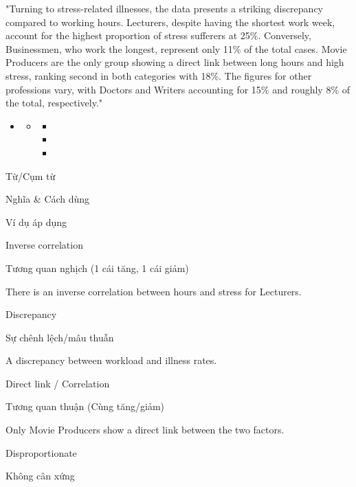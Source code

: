 \documentclass{../templateWriting/cdwriting}
\begin{document}
"Turning to stress-related illnesses, the data presents a striking discrepancy compared to working hours. Lecturers, despite having the shortest work week, account for the highest proportion of stress sufferers at 25\%. Conversely, Businessmen, who work the longest, represent only 11\% of the total cases. Movie Producers are the only group showing a direct link between long hours and high stress, ranking second in both categories with 18\%. The figures for other professions vary, with Doctors and Writers accounting for 15\% and roughly 8\% of the total, respectively."
\begin{itemize}
\item {}
\begin{itemize}
\item {}
\begin{itemize}
\item {}
\item {}
\item {}
\end{itemize}
\end{itemize}
\end{itemize}



Từ/Cụm từ

Nghĩa \& Cách dùng

Ví dụ áp dụng

Inverse correlation

Tương quan nghịch (1 cái tăng, 1 cái giảm)

There is an inverse correlation between hours and stress for Lecturers.

Discrepancy

Sự chênh lệch/mâu thuẫn

A discrepancy between workload and illness rates.

Direct link / Correlation

Tương quan thuận (Cùng tăng/giảm)

Only Movie Producers show a direct link between the two factors.

Disproportionate

Không cân xứng
\end{document}

